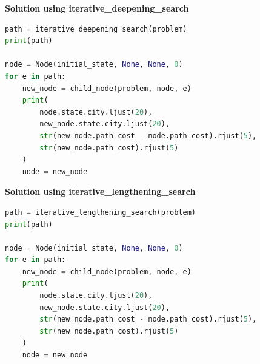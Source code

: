 {\centering \textbf{Solution using iterative\_deepening\_search} \par}

\begin{lstlisting}[language=Python]
path = iterative_deepening_search(problem)
print(path)

node = Node(initial_state, None, None, 0)
for e in path:
    new_node = child_node(problem, node, e)
    print(
        node.state.city.ljust(20), 
        new_node.state.city.ljust(20), 
        str(new_node.path_cost - node.path_cost).rjust(5), 
        str(new_node.path_cost).rjust(5)
    )
    node = new_node
\end{lstlisting}


{\centering \textbf{Solution using iterative\_lengthening\_search} \par}

\begin{lstlisting}[language=Python]
path = iterative_lengthening_search(problem)
print(path)

node = Node(initial_state, None, None, 0)
for e in path:
    new_node = child_node(problem, node, e)
    print(
        node.state.city.ljust(20), 
        new_node.state.city.ljust(20), 
        str(new_node.path_cost - node.path_cost).rjust(5), 
        str(new_node.path_cost).rjust(5)
    )
    node = new_node
\end{lstlisting}


